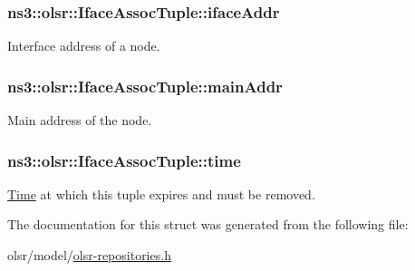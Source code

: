 \subsubsection[{\texorpdfstring{iface\+Addr}{ifaceAddr}}]{ ns3\+::olsr\+::\+Iface\+Assoc\+Tuple\+::iface\+Addr}\hypertarget{structns3_1_1olsr_1_1IfaceAssocTuple_a01bb563fdb87354699523982722ba4e1}{}\label{structns3_1_1olsr_1_1IfaceAssocTuple_a01bb563fdb87354699523982722ba4e1}


Interface address of a node. 

\subsubsection[{\texorpdfstring{main\+Addr}{mainAddr}}]{ ns3\+::olsr\+::\+Iface\+Assoc\+Tuple\+::main\+Addr}\hypertarget{structns3_1_1olsr_1_1IfaceAssocTuple_ab8718ae7260c4fcdf68fbdb3e86831c2}{}\label{structns3_1_1olsr_1_1IfaceAssocTuple_ab8718ae7260c4fcdf68fbdb3e86831c2}


Main address of the node. 

\subsubsection[{\texorpdfstring{time}{time}}]{ ns3\+::olsr\+::\+Iface\+Assoc\+Tuple\+::time}\hypertarget{structns3_1_1olsr_1_1IfaceAssocTuple_aa24bf7f7814e70fb42cbe708b59e4915}{}\label{structns3_1_1olsr_1_1IfaceAssocTuple_aa24bf7f7814e70fb42cbe708b59e4915}


\hyperlink{classns3_1_1Time}{Time} at which this tuple expires and must be removed. 



The documentation for this struct was generated from the following file\+:\begin{DoxyCompactItemize}
\item 
olsr/model/\hyperlink{olsr-repositories_8h}{olsr-\/repositories.\+h}\end{DoxyCompactItemize}
